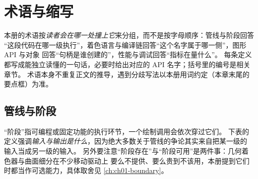 \documentclass[12pt,a4paper,fontset=fandol]{ctexbook}
\begin{document}
\appendix
\chapter{术语与缩写}
\label{ap:apA-glossary}

本册的术语按\emph{读者会在哪一处撞上它}来分组，而不是按字母顺序：管线与阶段回答
``这段代码在哪一级执行''，着色语言与编译链回答``这个名字属于哪一侧''，图形 API 与对象
回答``句柄是谁创建的''，性能与调试回答``指标在量什么''。
每条定义都写成能独立读懂的一句话，必要时给出对应的 API 名字；括号里的编号是相关章节。
术语本身不重复正文的推导，遇到分歧写法以本册用词约定（本章末尾的要点框）为准。

\section{管线与阶段}

``阶段''指可编程或固定功能的执行环节，一个绘制调用会依次穿过它们。
下表的定义强调\emph{输入与输出是什么}，因为绝大多数关于管线的争论其实来自把某一级的
输入当成另一级的输入。
另外要注意``阶段存在''与``阶段可用''是两件事：几何着色器与曲面细分在不少移动驱动上
要么不提供、要么贵到不该用，本册提到它们时都当作可选能力，具体取舍见 \ref{ch:ch01-boundary}。
\end{document}
